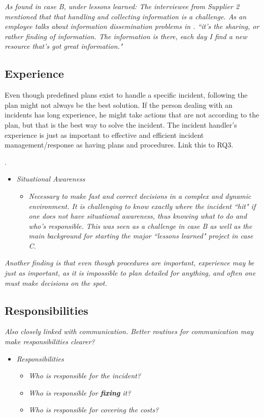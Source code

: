 \textit{As found in case B, under lessons learned:
The interviewee from Supplier 2 mentioned that that handling and collecting information is a challenge. As an employee talks about information dissemination problems in \cite{ahmad2012incident}.
``it's the sharing, or rather finding of information. The information is there, each day I find a new resource that's got great information."}

\subsection{Experience}

Even though predefined plans exist to handle a specific incident, following the plan might not always be the best solution. If the person dealing with an incidents has long experience, he might take actions that are not according to the plan, but that is the best way to solve the incident. The incident handler's experience is just as important to effective and efficient incident management/response as having plans and procedures. Link this to RQ3.

.

\begin{itemize}
\item \textit{Situational Awareness}
\begin{itemize}
\item\textit{ Necessary to make fast and correct decisions in a complex and dynamic environment. It is challenging to know exactly where the incident ``hit" if one does not have situational awareness, thus knowing what to do and who's responsible. This was  seen as a challenge in case B as well as the main background for starting the major ``lessons learned" project in case C.}
\end{itemize}
\end{itemize}

\textit{Another finding is that even though procedures are important, experience may be just as important, as it is impossible to plan detailed for anything, and often one must make decisions on the spot.}

\subsection{Responsibilities}
\textit{Also closely linked with communication. Better routines for communication may make responsibilities clearer?}

\begin{itemize}
\item \textit{Responsibilities}
\begin{itemize}
\item \textit{Who is responsible for the incident?}
\item \textit{Who is responsible for \textbf{fixing} it?}
\item \textit{Who is responsible for covering the costs?}
\end{itemize}
\end{itemize}

